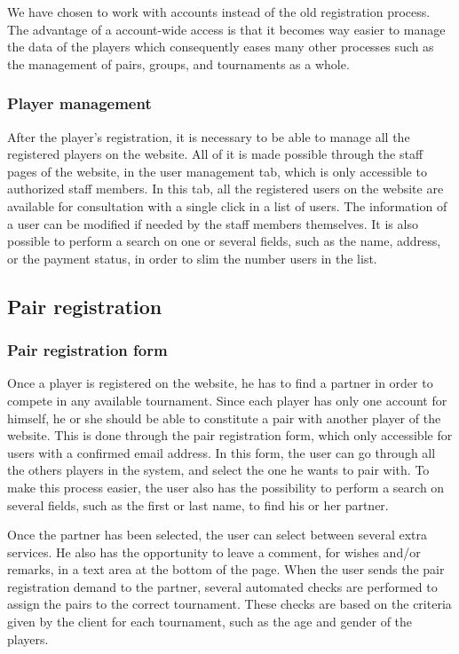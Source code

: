 We have chosen to work with accounts instead of the old registration process.
The advantage of a account-wide access is that it becomes way easier
to manage the data of the players which consequently eases many other
processes such as the management of pairs, groups, and tournaments as a whole.

\subsubsection{Player management}
\label{subs:Player management}

After the player's registration, it is necessary to be able to manage all the
registered players on the website. All of it is made possible through the staff
pages of the website, in the user management tab, which is only accessible
to authorized staff members. In this tab, all the registered users on the
website are available for consultation with a single click in a list of users.
The information of a user can be modified if needed by the staff members
themselves. It is also possible to perform a search on one or several fields,
such as the name, address, or the payment status, in order to slim the number
users in the list.

\subsection{Pair registration}
\label{sub:Pair registration}

\subsubsection{Pair registration form}
\label{subs:Pair registration form}

Once a player is registered on the website, he has to find a partner in order
to compete in any available tournament. Since each player has only one account
for himself, he or she should be able to constitute a pair with another
player of the website. This is done through the pair registration form,
which only accessible for users with a confirmed email address. In this form,
the user can go through all the others players in the system, and select
the one he wants to pair with. To make this process easier, the user also has
the possibility to perform a search on several fields, such as the first or
last name, to find his or her partner. \newline

Once the partner has been selected, the user can select between several extra
services. He also has the opportunity to leave a comment, for wishes and/or
remarks, in a text area at the bottom of the page. When the user sends the
pair registration demand to the partner, several automated checks are performed
to assign the pairs to the correct tournament. These checks are based
on the criteria given by the client for each tournament, such as the age and
gender of the players. \newline

